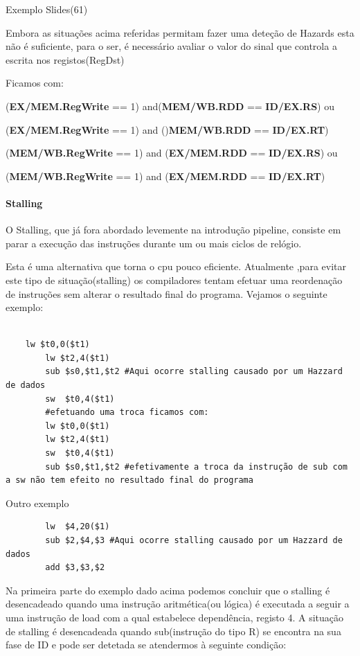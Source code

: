 \documentclass[10pt,a4paper]{book}
\begin{document}
		Exemplo Slides(61)

		\newline

		Embora as situações acima referidas permitam fazer uma deteção de Hazards esta não é suficiente, para o ser, é necessário avaliar o valor do sinal que controla a escrita nos registos(RegDst)

		\newline
		Ficamos com:

		(\textbf{EX/MEM.RegWrite} == 1) and(\textbf{MEM/WB.RDD} == \textbf{ID/EX.RS}) ou

		(\textbf{EX/MEM.RegWrite} == 1) and ()\textbf{MEM/WB.RDD} == \textbf{ID/EX.RT})

		(\textbf{MEM/WB.RegWrite} == 1) and (\textbf{EX/MEM.RDD} == \textbf{ID/EX.RS}) ou

		(\textbf{MEM/WB.RegWrite} == 1) and (\textbf{EX/MEM.RDD} == \textbf{ID/EX.RT})




	 \paragraph{Stalling}

	 O Stalling, que já fora abordado levemente na introdução pipeline, consiste em parar a execução das instruções durante um ou mais ciclos de relógio.


	 Esta é uma alternativa que torna o cpu pouco eficiente. Atualmente ,para evitar este tipo de situação(stalling) os compiladores tentam efetuar uma reordenação de instruções sem alterar o resultado final do programa. Vejamos o seguinte exemplo:

	 \begin{lstlisting}

    lw $t0,0($t1)
		lw $t2,4($t1)
		sub $s0,$t1,$t2 #Aqui ocorre stalling causado por um Hazzard de dados
		sw  $t0,4($t1)
 		#efetuando uma troca ficamos com:
		lw $t0,0($t1)
		lw $t2,4($t1)
		sw  $t0,4($t1)
		sub $s0,$t1,$t2 #efetivamente a troca da instrução de sub com a sw não tem efeito no resultado final do programa
	 \end{lstlisting}

	 Outro exemplo

	 \begin{lstlisting}
	 	lw  $4,20($1)
	 	sub $2,$4,$3 #Aqui ocorre stalling causado por um Hazzard de dados
	 	add $3,$3,$2
	 \end{lstlisting}

	 Na primeira parte do exemplo dado acima podemos concluir que o stalling é desencadeado quando uma instrução aritmética(ou lógica) é executada a seguir a uma instrução de load com a qual estabelece dependência, registo 4. A situação de stalling é desencadeada quando sub(instrução do tipo R) se encontra na sua fase de ID e pode ser detetada se atendermos à seguinte condição:
\end{document}
